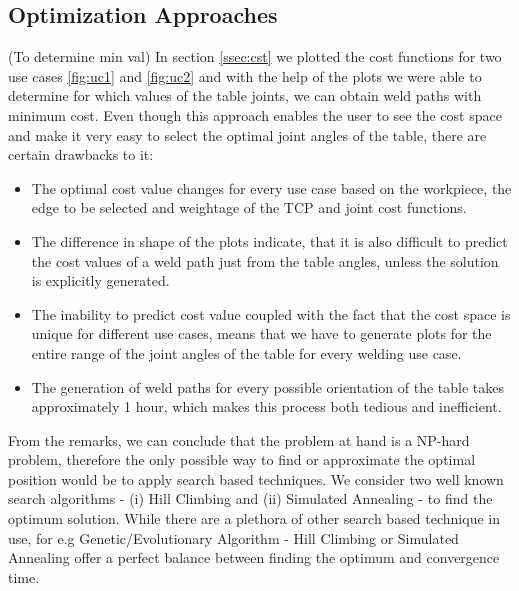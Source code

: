 \subsection{Optimization Approaches}
(To determine min val)
In section \ref{ssec:cst} we plotted the cost functions for two use cases \ref{fig:uc1} and \ref{fig:uc2} and with the help of the plots we were able to determine for which values of the table joints, we can obtain weld paths with minimum cost. Even though this approach enables the user to see the cost space and make it very easy to select the optimal joint angles of the table, there are certain drawbacks to it:
\begin{itemize}
	\item The optimal cost value changes for every use case based on the workpiece, the edge to be selected and weightage of the TCP and joint cost functions.
	\item The difference in shape of the plots indicate, that it is also difficult to predict the cost values of a weld path just from the table angles, unless the solution is explicitly generated. 
	\item The inability to predict cost value coupled with the fact that the cost space is unique for different use cases, means that we have to generate plots for the entire range of the joint angles of the table for every welding use case.
	\item The generation of weld paths for every possible orientation of the table takes approximately 1 hour, which makes this process both tedious and inefficient. 
\end{itemize}
From the remarks, we can conclude that the problem at hand is a NP-hard problem, therefore the only possible way to find or approximate the optimal position would be to apply search based techniques. We consider two well known search algorithms - (i) Hill Climbing and (ii) Simulated Annealing - to find the optimum solution. While there are a plethora of other search based technique in use, for e.g Genetic/Evolutionary Algorithm - Hill Climbing or Simulated Annealing offer a perfect balance between finding the optimum and convergence time.
